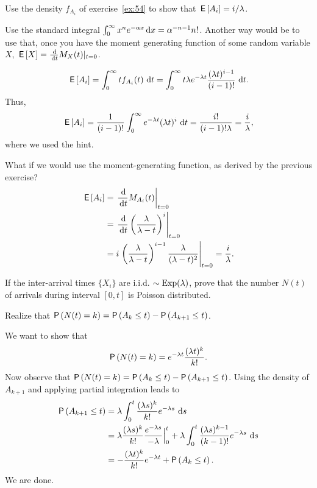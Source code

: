 \begin{extra}
  Use the density $f_{A_i}$ of exercise~\ref{ex:54} to show that $\,\mathsf{E}\left[A_i\right]=i/\lambda$. 
  \begin{hint}
Use the standard integral 
    $\int_0^\infty x^n e^{-\alpha x} \,\text{d}x =
    \alpha^{-n-1}n!$. 
    Another way would be to use that, once you have the moment
    generating function of some random variable $X$,
    $\E X = \frac{\d}{\d t} M_X(t) |_{t=0}$. 
  \end{hint}
\begin{solution}
  \begin{equation*}
\,\mathsf{E}\left[A_i\right] = \int_0^\infty t f_{A_i} (t) \, \,\text{d}t  = 
\int_0^\infty t  \lambda e^{-\lambda t} \frac{(\lambda t)^{i-1}}{(i-1)!}\, \,\text{d}t.
  \end{equation*}
Thus, 
  \begin{equation*}
\,\mathsf{E}\left[A_i\right] = \frac{1}{(i-1)!} \int_0^\infty   e^{-\lambda t} (\lambda t)^i\,\,\text{d}t = \frac{i!}{(i-1)!\lambda}=\frac{i}\lambda,
  \end{equation*}
  where we used the hint.

What if we would use the moment-generating function, as derived by the previous exercise?
\begin{align*}
    \E{A_i} 
&= \left.\frac{\d}{\d t} M_{A_i}(t)\right|_{t=0} \\
&= \left.\frac{\d}{\d t} \left(\frac{\lambda}{\lambda-t}\right)^i\right|_{t=0} \\
&= i \left.\left(\frac{\lambda}{\lambda-t}\right)^{i-1}\frac{\lambda}{(\lambda-t)^2}\right|_{t=0} 
= \frac i\lambda.
\end{align*}


\end{solution}
\end{extra}

\begin{exercise}
  If the inter-arrival times $\{X_i\}$ are i.i.d.
  $\sim \operatorname{Exp}(\lambda)$, prove that the number $N(t)$ of arrivals during interval $[0,t]$ is Poisson distributed.
  \begin{hint}
  Realize that
    $\P{N(t)=k} = \P{A_k \leq t} - \P{A_{k+1} \leq t}$.
  \end{hint}
    \begin{solution}
      We want to show that
    \begin{equation*}
      \P{N(t)=k} = e^{-\lambda t}\frac{(\lambda t)^k}{k!}.
    \end{equation*}
    Now observe that $\P{N(t)=k} = \P{A_k \leq t} - \P{A_{k+1} \leq t}$.
    Using the density of $A_{k+1}$ and applying partial integration leads to
\begin{align*}
\P{A_{k+1} \leq t} 
&= \lambda \int_0^t \frac{(\lambda s)^{k}}{k!}e^{-\lambda s}\, \d s \\
&= \lambda \frac{(\lambda s)^{k}}{k!}\frac{e^{-\lambda s}}{-\lambda} \Big|_{0}^t + \lambda \int_0^t \frac{(\lambda s)^{k-1}}{(k-1)!}e^{-\lambda s}\, \d s \\
&= - \frac{(\lambda t)^{k}}{k!} e^{-\lambda t} + \P{A_k \leq t}.
\end{align*}
We are done.
    \end{solution}
\end{exercise}

